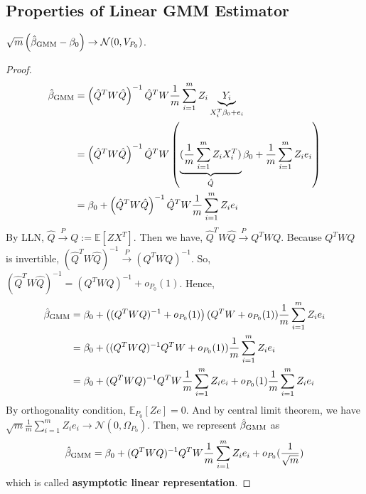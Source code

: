\documentclass[11pt]{elegantbook}
\begin{document}
\subsection{Properties of Linear GMM Estimator}
\begin{theorem}[Asymptotic]
    $\sqrt{m}\left(\hat{\beta}_\textnormal{GMM}-\beta_0\right) \rightarrow \mathcal{N}(0,V_{P_0})$.
\end{theorem}
\begin{proof}
    \begin{equation}
        \begin{aligned}
            \hat{\beta}_\textnormal{GMM}&=\left(\hat{Q}^TW\hat{Q}\right)^{-1}\hat{Q}^TW\frac{1}{m}\sum_{i=1}^mZ_i\underbrace{Y_i}_{X_i^T\beta_0+e_i}\\
            &=\left(\hat{Q}^TW\hat{Q}\right)^{-1}\hat{Q}^TW\left(\underbrace{(\frac{1}{m}\sum_{i=1}^mZ_iX_i^T)}_{\hat{Q}}\beta_0+\frac{1}{m}\sum_{i=1}^mZ_ie_i\right)\\
            &=\beta_0+\left(\hat{Q}^TW\hat{Q}\right)^{-1}\hat{Q}^TW\frac{1}{m}\sum_{i=1}^mZ_ie_i
        \end{aligned}
        \nonumber
    \end{equation}
    By LLN, $\hat{Q} \stackrel{P}{\longrightarrow} Q:=\mathbb{E}[ZX^T]$. Then we have, $\hat{Q}^TW\hat{Q} \stackrel{P}{\longrightarrow} Q^TWQ$. Because $Q^TWQ$ is invertible, $(\hat{Q}^TW\hat{Q})^{-1} \stackrel{P}{\longrightarrow} (Q^TWQ)^{-1}$. So, $(\hat{Q}^TW\hat{Q})^{-1}=(Q^TWQ)^{-1}+o_{P_0}(1)$. Hence,
    \begin{equation}
        \begin{aligned}
            \hat{\beta}_\textnormal{GMM}&=\beta_0+\left((Q^TWQ)^{-1}+o_{P_0}(1)\right)(Q^TW+o_{P_0}(1))\frac{1}{m}\sum_{i=1}^mZ_ie_i\\
            &=\beta_0+((Q^TWQ)^{-1}Q^TW+o_{P_0}(1))\frac{1}{m}\sum_{i=1}^mZ_ie_i\\
            &=\beta_0+(Q^TWQ)^{-1}Q^TW\frac{1}{m}\sum_{i=1}^mZ_ie_i+o_{P_0}(1)\frac{1}{m}\sum_{i=1}^mZ_ie_i
        \end{aligned}
        \nonumber
    \end{equation}
    By orthogonality condition, $\mathbb{E}_{P_0}[Ze]=0$. And by central limit theorem, we have $\sqrt{m}\frac{1}{m}\sum_{i=1}^mZ_ie_i \rightarrow \mathcal{N}(0,\Omega_{P_0})$. Then, we represent $\hat{\beta}_\textnormal{GMM}$ as
    \begin{equation}
        \begin{aligned}
            \hat{\beta}_\textnormal{GMM}=\beta_0+(Q^TWQ)^{-1}Q^TW\frac{1}{m}\sum_{i=1}^mZ_ie_i+o_{P_0}(\frac{1}{\sqrt{m}})
        \end{aligned}
        \label{hat_beta_minus_beta}
    \end{equation}
    which is called \textbf{asymptotic linear representation}.


\end{proof}
\end{document}
